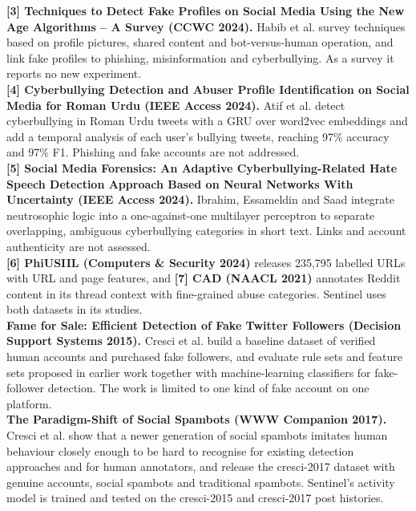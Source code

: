 \noindent\textbf{[3] Techniques to Detect Fake Profiles on Social Media Using the New Age Algorithms -- A Survey (CCWC 2024).} Habib et al. \cite{lit3} survey techniques based on profile pictures, shared content and bot-versus-human operation, and link fake profiles to phishing, misinformation and cyberbullying. As a survey it reports no new experiment.\\

\noindent\textbf{[4] Cyberbullying Detection and Abuser Profile Identification on Social Media for Roman Urdu (IEEE Access 2024).} Atif et al. \cite{lit4} detect cyberbullying in Roman Urdu tweets with a GRU over word2vec embeddings and add a temporal analysis of each user's bullying tweets, reaching 97\% accuracy and 97\% F1. Phishing and fake accounts are not addressed.\\

\noindent\textbf{[5] Social Media Forensics: An Adaptive Cyberbullying-Related Hate Speech Detection Approach Based on Neural Networks With Uncertainty (IEEE Access 2024).} Ibrahim, Essameldin and Saad \cite{lit5} integrate neutrosophic logic into a one-against-one multilayer perceptron to separate overlapping, ambiguous cyberbullying categories in short text. Links and account authenticity are not assessed.\\

\noindent\textbf{[6] PhiUSIIL (Computers \& Security 2024)} \cite{phiusiil} releases 235,795 labelled URLs with URL and page features, and \textbf{[7] CAD (NAACL 2021)} \cite{cad} annotates Reddit content in its thread context with fine-grained abuse categories. Sentinel uses both datasets in its studies.\\

\noindent\textbf{\cite{cresci2015} Fame for Sale: Efficient Detection of Fake Twitter Followers (Decision Support Systems 2015).} Cresci et al. build a baseline dataset of verified human accounts and purchased fake followers, and evaluate rule sets and feature sets proposed in earlier work together with machine-learning classifiers for fake-follower detection. The work is limited to one kind of fake account on one platform.\\

\noindent\textbf{\cite{cresci2017} The Paradigm-Shift of Social Spambots (WWW Companion 2017).} Cresci et al. show that a newer generation of social spambots imitates human behaviour closely enough to be hard to recognise for existing detection approaches and for human annotators, and release the cresci-2017 dataset with genuine accounts, social spambots and traditional spambots. Sentinel's activity model is trained and tested on the cresci-2015 and cresci-2017 post histories.\\

